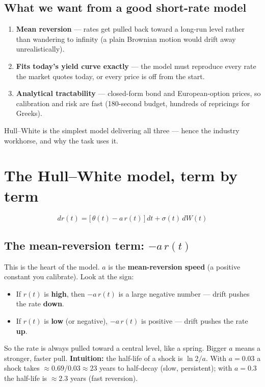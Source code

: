 \documentclass[11pt]{article}
\begin{document}
\subsection{What we want from a good short-rate model}
\begin{enumerate}[leftmargin=1.6em]
  \item \textbf{Mean reversion} --- rates get pulled back toward a long-run level
        rather than wandering to infinity (a plain Brownian motion would drift away
        unrealistically).
  \item \textbf{Fits today's yield curve exactly} --- the model must reproduce every
        rate the market quotes today, or every price is off from the start.
  \item \textbf{Analytical tractability} --- closed-form bond and European-option
        prices, so calibration and risk are fast (180-second budget, hundreds of
        repricings for Greeks).
\end{enumerate}
Hull--White is the simplest model delivering all three --- hence the industry
workhorse, and why the task uses it.

\section{The Hull--White model, term by term}
\[
  dr(t) = \big[\,\theta(t) - a\,r(t)\,\big]\,dt + \sigma(t)\,dW(t)
\]

\subsection{The mean-reversion term: $-a\,r(t)$}
This is the heart of the model. $a$ is the \textbf{mean-reversion speed} (a positive
constant you calibrate). Look at the sign:
\begin{itemize}[leftmargin=1.4em]
  \item If $r(t)$ is \textbf{high}, then $-a\,r(t)$ is a large negative number ---
        drift pushes the rate \textbf{down}.
  \item If $r(t)$ is \textbf{low} (or negative), $-a\,r(t)$ is positive --- drift
        pushes the rate \textbf{up}.
\end{itemize}
So the rate is always pulled toward a central level, like a spring. Bigger $a$ means a
stronger, faster pull. \textbf{Intuition:} the half-life of a shock is $\ln 2 / a$.
With $a=0.03$ a shock takes $\approx 0.69/0.03 \approx 23$ years to half-decay (slow,
persistent); with $a=0.3$ the half-life is $\approx 2.3$ years (fast reversion).
\end{document}
